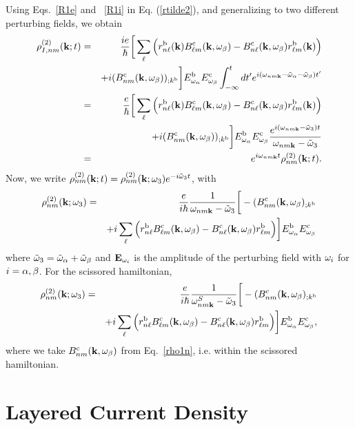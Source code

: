 \documentclass[floatfix,prb,aps,superscriptaddress,11pt,preprint]{revtex4}
\begin{document}
Using Eqs.~\eqref{R1e} and ~\eqref{R1i} in Eq. (\ref{rtilde2}),
and generalizing to two different perturbing fields,
we obtain
\begin{eqnarray}\label{rtilde33}
{\rho}^{(2)}_{I,nm}(\mathbf{k};t)
&=&
\frac{ie}{\hbar}
\bigg[
\sum_{\ell}
\Big(
r^{\mathrm{b}}_{n\ell}(\mathbf{k})
B^{\mathrm{c}}_{\ell m}(\mathbf{k},\omega_\beta)
-
B^{\mathrm{c}}_{n\ell}(\mathbf{k},\omega_\beta)
r^{\mathrm{b}}_{\ell m}(\mathbf{k})
\Big)
\nonumber \\
&&+
i
(B^{\mathrm{c}}_{nm}(\mathbf{k},\omega_\beta))_{;k^{\mathrm{b}}}
\bigg]
E^{\mathrm{b}}_{\omega_\alpha}E_{\omega_\beta}^{\mathrm{c}}
\int_{-\infty}^t dt'
e^{i(\omega_{nm\mathbf{k}}-\tilde\omega_\alpha-\tilde\omega_\beta)t'}
\nonumber \\
&=&
\frac{e}{\hbar}
\bigg[
\sum_{\ell}
\Big(
r^{\mathrm{b}}_{n\ell}(\mathbf{k})
B^{\mathrm{c}}_{\ell m}(\mathbf{k},\omega_\beta)
-
B^{\mathrm{c}}_{n\ell}(\mathbf{k},\omega_\beta)
r^{\mathrm{b}}_{\ell m}(\mathbf{k})
\Big)
\nonumber \\
&&+
i
(B^{\mathrm{c}}_{nm}(\mathbf{k},\omega_\beta))_{;k^{\mathrm{b}}}
\bigg]
E^{\mathrm{b}}_{\omega_\alpha}E_{\omega_\beta}^{\mathrm{c}}
\frac{e^{i(\omega_{nm\mathbf{k}}-\tilde\omega_3)t}}
{\omega_{nm\mathbf{k}}-\tilde\omega_3}
\nonumber \\
&=&
e^{i\omega_{nm\mathbf{k}}t}
\rho_{nm}^{(2)}(\mathbf{k};t)
.
\end{eqnarray}
Now, we write
$\rho_{nm}^{(2)}(\mathbf{k};t)=\rho_{nm}^{(2)}(\mathbf{k};\omega_3)e^{-i\tilde\omega_3 t}$,
with
\begin{eqnarray}\label{rho2}
{\rho}_{nm}^{(2)}(\mathbf{k};\omega_3)&=&\frac{e}{i\hbar}\frac{1}{\omega_{nm\mathbf{k}}-\tilde\omega_3}
\bigg[-(B_{nm}^{\mathrm{c}}(\mathbf{k},\omega_\beta)_{;k^{\mathrm{b}}}
\nonumber \\
&&
+i\sum_\ell\Big(r_{n\ell}^{\mathrm{b}}B_{\ell m}^{\mathrm{c}}(\mathbf{k},\omega_\beta) - B_{n\ell}^{\mathrm{c}}(\mathbf{k},\omega_\beta)
  r_{\ell m}^{\mathrm{b}}\Big)
\bigg] 
E^{\mathrm{b}}_{\omega_\alpha}E_{\omega_\beta}^{\mathrm{c}}
\end{eqnarray} 
where $\tilde\omega_3=\tilde\omega_\alpha+\tilde\omega_\beta$ and $\mathbf{E}_{\omega_i}$ is the amplitude of the perturbing
field with $\omega_i$ for $i=\alpha,\beta$. 
 For the scissored hamiltonian,
\begin{eqnarray}\label{rho2n}
{\rho}_{nm}^{(2)}(\mathbf{k};\omega_3)&=&\frac{e}{i\hbar}\frac{1}{\omega^S_{nm\mathbf{k}}-\tilde\omega_3}
\bigg[-(B_{nm}^{\mathrm{c}}(\mathbf{k},\omega_\beta)_{;k^{\mathrm{b}}}
\nonumber \\
&&
+i\sum_\ell\Big(r_{n\ell}^{\mathrm{b}}B_{\ell m}^{\mathrm{c}}(\mathbf{k},\omega_\beta) - B_{n\ell}^{\mathrm{c}}(\mathbf{k},\omega_\beta)
  r_{\ell m}^{\mathrm{b}}\Big)
\bigg]
E^{\mathrm{b}}_{\omega_\alpha}E_{\omega_\beta}^{\mathrm{c}}
,
\end{eqnarray}
where we take $B_{nm}^{\mathrm{c}}(\mathbf{k},\omega_\beta)$ 
from Eq.~\eqref{rho1n}, i.e. within the scissored
hamiltonian. 


\section{Layered Current Density}\label{cd}
\end{document}
